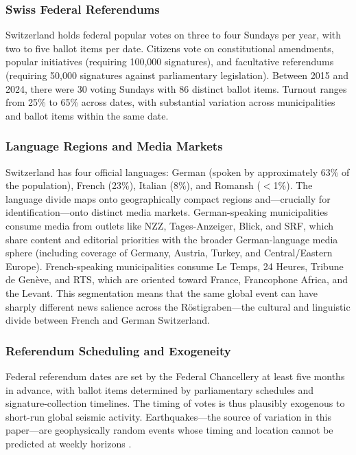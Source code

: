 \documentclass[12pt]{article}
\begin{document}
\subsubsection*{Swiss Federal Referendums} Switzerland holds federal popular votes on three to four Sundays per year, with two to five ballot items per date. Citizens vote on constitutional amendments, popular initiatives (requiring 100,000 signatures), and facultative referendums (requiring 50,000 signatures against parliamentary legislation). Between 2015 and 2024, there were 30 voting Sundays with 86 distinct ballot items. Turnout ranges from 25\% to 65\% across dates, with substantial variation across municipalities and ballot items within the same date.

\subsubsection*{Language Regions and Media Markets} Switzerland has four official languages: German (spoken by approximately 63\% of the population), French (23\%), Italian (8\%), and Romansh ($<$1\%). The language divide maps onto geographically compact regions and---crucially for identification---onto distinct media markets. German-speaking municipalities consume media from outlets like NZZ, Tages-Anzeiger, Blick, and SRF, which share content and editorial priorities with the broader German-language media sphere (including coverage of Germany, Austria, Turkey, and Central/Eastern Europe). French-speaking municipalities consume Le Temps, 24 Heures, Tribune de Gen\`eve, and RTS, which are oriented toward France, Francophone Africa, and the Levant. This segmentation means that the same global event can have sharply different news salience across the R\"ostigraben---the cultural and linguistic divide between French and German Switzerland.

\subsubsection*{Referendum Scheduling and Exogeneity} Federal referendum dates are set by the Federal Chancellery at least five months in advance, with ballot items determined by parliamentary schedules and signature-collection timelines. The timing of votes is thus plausibly exogenous to short-run global seismic activity. Earthquakes---the source of variation in this paper---are geophysically random events whose timing and location cannot be predicted at weekly horizons \citep{geller1997earthquakes}.
\end{document}
